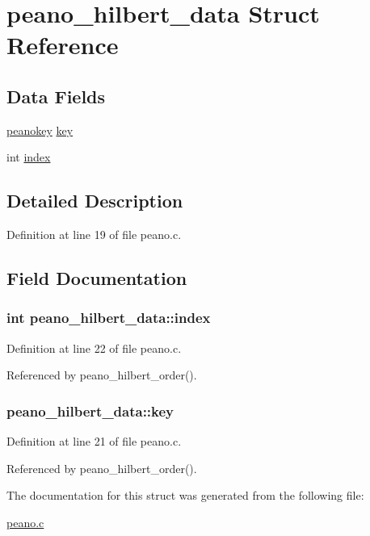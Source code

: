 \hypertarget{structpeano__hilbert__data}{
\section{peano\_\-hilbert\_\-data Struct Reference}
\label{structpeano__hilbert__data}
}
\subsection*{Data Fields}
\begin{DoxyCompactItemize}
\item 
\hyperlink{allvars_8h_a63f10772bd5776dcb4b6301f425e0d26}{peanokey} \hyperlink{structpeano__hilbert__data_aaa704e82d9ca3b022e83cb23fe715131}{key}
\item 
int \hyperlink{structpeano__hilbert__data_a37ba0b5554835eecd76473f5cd02f257}{index}
\end{DoxyCompactItemize}


\subsection{Detailed Description}


Definition at line 19 of file peano.c.



\subsection{Field Documentation}
\hypertarget{structpeano__hilbert__data_a37ba0b5554835eecd76473f5cd02f257}{
\subsubsection[{index}]{\setlength{\rightskip}{0pt plus 5cm}int {\bf peano\_\-hilbert\_\-data::index}}}
\label{structpeano__hilbert__data_a37ba0b5554835eecd76473f5cd02f257}


Definition at line 22 of file peano.c.



Referenced by peano\_\-hilbert\_\-order().

\hypertarget{structpeano__hilbert__data_aaa704e82d9ca3b022e83cb23fe715131}{
\subsubsection[{key}]{ {\bf peano\_\-hilbert\_\-data::key}}}
\label{structpeano__hilbert__data_aaa704e82d9ca3b022e83cb23fe715131}


Definition at line 21 of file peano.c.



Referenced by peano\_\-hilbert\_\-order().



The documentation for this struct was generated from the following file:\begin{DoxyCompactItemize}
\item 
\hyperlink{peano_8c}{peano.c}\end{DoxyCompactItemize}
